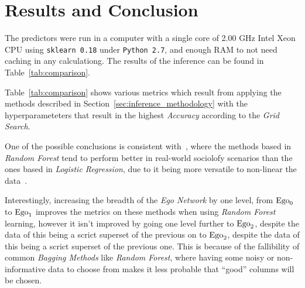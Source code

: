
\section{Results and Conclusion}
\label{sec:results}


The predictors were run in a computer with a single core of 2.00 GHz Intel Xeon CPU using \texttt{sklearn 0.18} under \texttt{Python 2.7}, and enough RAM to not need caching in any calculationg. The results of the inference can be found in Table~\ref{tab:comparison}.


Table~\ref{tab:comparison} shows various metrics which result from applying the methods described in Section~\ref{sec:inference_methodology} with the hyperparameteters that result in the highest \emph{Accuracy} according to the \emph{Grid Search}.

One of the possible conclusions is consistent with~\cite{muchlinski2016}, where the methods based in \emph{Random Forest} tend to perform better in real-world sociolofy scenarios than the ones based in \emph{Logistic Regression}, due to it being more versatile to non-linear the data~\cite{logisticvsdecision}.

Interestingly, increasing the breadth of the \emph{Ego Network} by one level, from $\operatorname{Ego}_0$ to $\operatorname{Ego}_1$ improves the metrics on these methods when using \emph{Random Forest} learning, however it isn't improved by going one level further to $\operatorname{Ego}_2$, despite the data of this being a scrict superset of the previous on to $\operatorname{Ego}_2$, despite the data of this being a scrict superset of the previous one. This is because of the fallibility of common \emph{Bagging Methods} like \emph{Random Forest}, where having some noisy or non-informative data to choose from makes it less probable that ``good'' columns will be chosen.

